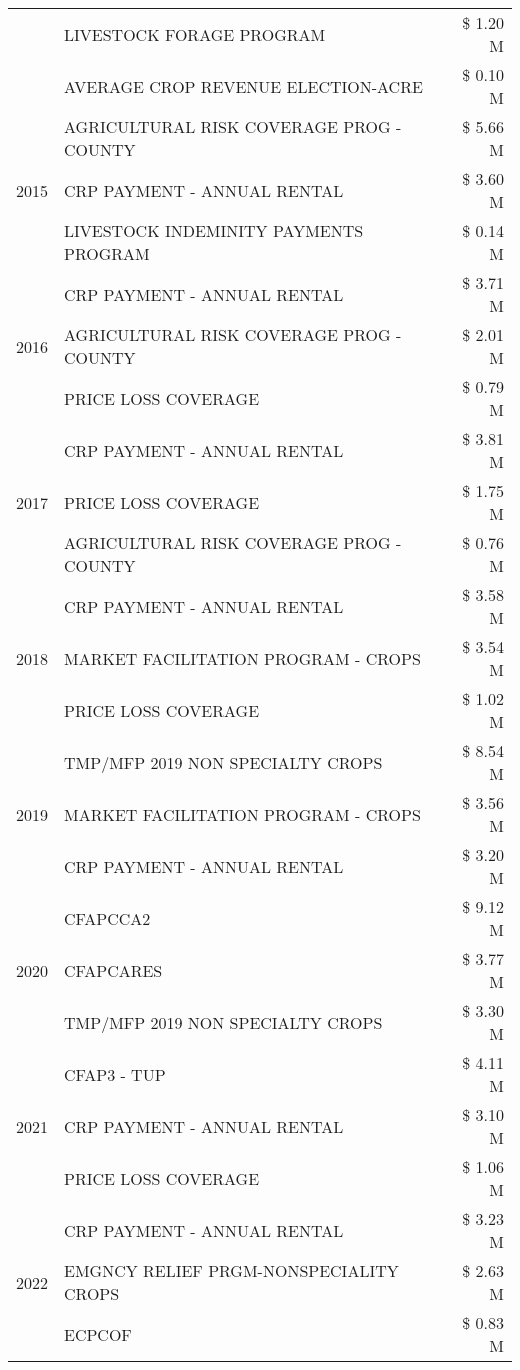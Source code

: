 \begin{tabular}{llr}
 & LIVESTOCK FORAGE PROGRAM & \$ 1.20 M \\
 & AVERAGE CROP REVENUE ELECTION-ACRE & \$ 0.10 M \\
\cline{1-3}
\multirow[t]{3}{*}{2015} & AGRICULTURAL RISK COVERAGE PROG - COUNTY & \$ 5.66 M \\
 & CRP PAYMENT - ANNUAL RENTAL & \$ 3.60 M \\
 & LIVESTOCK INDEMINITY PAYMENTS PROGRAM & \$ 0.14 M \\
\cline{1-3}
\multirow[t]{3}{*}{2016} & CRP PAYMENT - ANNUAL RENTAL & \$ 3.71 M \\
 & AGRICULTURAL RISK COVERAGE PROG - COUNTY & \$ 2.01 M \\
 & PRICE LOSS COVERAGE & \$ 0.79 M \\
\cline{1-3}
\multirow[t]{3}{*}{2017} & CRP PAYMENT - ANNUAL RENTAL & \$ 3.81 M \\
 & PRICE LOSS COVERAGE & \$ 1.75 M \\
 & AGRICULTURAL RISK COVERAGE PROG - COUNTY & \$ 0.76 M \\
\cline{1-3}
\multirow[t]{3}{*}{2018} & CRP PAYMENT - ANNUAL RENTAL & \$ 3.58 M \\
 & MARKET FACILITATION PROGRAM - CROPS & \$ 3.54 M \\
 & PRICE LOSS COVERAGE & \$ 1.02 M \\
\cline{1-3}
\multirow[t]{3}{*}{2019} & TMP/MFP 2019 NON SPECIALTY CROPS & \$ 8.54 M \\
 & MARKET FACILITATION PROGRAM - CROPS & \$ 3.56 M \\
 & CRP PAYMENT - ANNUAL RENTAL & \$ 3.20 M \\
\cline{1-3}
\multirow[t]{3}{*}{2020} & CFAPCCA2 & \$ 9.12 M \\
 & CFAPCARES & \$ 3.77 M \\
 & TMP/MFP 2019 NON SPECIALTY CROPS & \$ 3.30 M \\
\cline{1-3}
\multirow[t]{3}{*}{2021} & CFAP3 - TUP & \$ 4.11 M \\
 & CRP PAYMENT - ANNUAL RENTAL & \$ 3.10 M \\
 & PRICE LOSS COVERAGE & \$ 1.06 M \\
\cline{1-3}
\multirow[t]{3}{*}{2022} & CRP PAYMENT - ANNUAL RENTAL & \$ 3.23 M \\
 & EMGNCY RELIEF PRGM-NONSPECIALITY CROPS & \$ 2.63 M \\
 & ECPCOF & \$ 0.83 M \\
\cline{1-3}
\bottomrule
\end{tabular}
